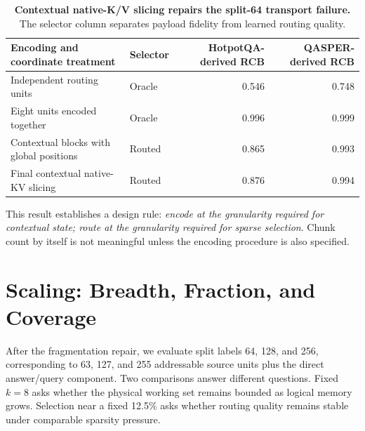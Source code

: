 \documentclass[11pt]{article}
\begin{document}
\begin{table}[H]
\centering
\small
\caption{\textbf{Contextual native-K/V slicing repairs the split-64 transport failure.} The
selector column separates payload fidelity from learned routing quality.}
\label{tab:fragmentation}
\begin{tabularx}{\textwidth}{Xlrr}
\toprule
Encoding and coordinate treatment & Selector & HotpotQA-derived RCB & QASPER-derived RCB \\
\midrule
Independent routing units & Oracle & 0.546 & 0.748 \\
Eight units encoded together & Oracle & 0.996 & 0.999 \\
Contextual blocks with global positions & Routed & 0.865 & 0.993 \\
Final contextual native-KV slicing & Routed & 0.876 & 0.994 \\
\bottomrule
\end{tabularx}
\end{table}

This result establishes a design rule: \emph{encode at the granularity required for
contextual state; route at the granularity required for sparse selection}. Chunk count by
itself is not meaningful unless the encoding procedure is also specified.

\section{Scaling: Breadth, Fraction, and Coverage}
\label{sec:scaling}

After the fragmentation repair, we evaluate split labels 64, 128, and 256, corresponding to
63, 127, and 255 addressable source units plus the direct answer/query component. Two comparisons answer different questions. Fixed $k=8$ asks whether
the physical working set remains bounded as logical memory grows. Selection near a fixed 12.5\%
asks whether routing quality remains stable under comparable sparsity pressure.
\end{document}

